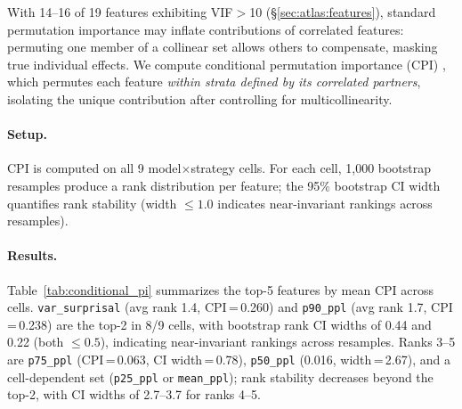With 14--16 of 19 features exhibiting VIF${>}$10 (\S\ref{sec:atlas:features}), standard permutation importance may inflate contributions of correlated features: permuting one member of a collinear set allows others to compensate, masking true individual effects.
We compute conditional permutation importance (CPI) \citep{strobl2008_conditional}, which permutes each feature \emph{within strata defined by its correlated partners}, isolating the unique contribution after controlling for multicollinearity.

\paragraph{Setup.}
CPI is computed on all 9 model$\times$strategy cells.
For each cell, 1{,}000 bootstrap resamples produce a rank distribution per feature; the 95\% bootstrap CI width quantifies rank stability (width $\leq 1.0$ indicates near-invariant rankings across resamples).

\paragraph{Results.}
Table~\ref{tab:conditional_pi} summarizes the top-5 features by mean CPI across cells.
\texttt{var\_surprisal} (avg rank 1.4, CPI\,=\,0.260) and \texttt{p90\_ppl} (avg rank 1.7, CPI\,=\,0.238) are the top-2 in 8/9 cells, with bootstrap rank CI widths of 0.44 and 0.22 (both $\leq 0.5$), indicating near-invariant rankings across resamples.
Ranks 3--5 are \texttt{p75\_ppl} (CPI\,=\,0.063, CI width\,=\,0.78), \texttt{p50\_ppl} (0.016, width\,=\,2.67), and a cell-dependent set (\texttt{p25\_ppl} or \texttt{mean\_ppl}); rank stability decreases beyond the top-2, with CI widths of 2.7--3.7 for ranks 4--5.

